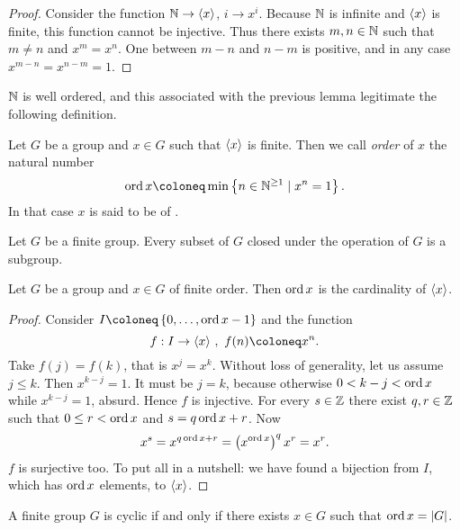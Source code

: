 \begin{proof}
Consider the function \(\mathbb N \to \left\langle x\right\rangle\), \(i \to x^i\). Because \(\mathbb N\) is infinite and \(\left\langle x\right\rangle\) is finite, this function cannot be injective. Thus there exists \(m, n \in \mathbb N\) such that \(m \ne n\) and \(x^m = x^n\). One between \(m-n\) and \(n-m\) is positive, and in any case \(x^{m-n} = x^{n-m} = 1\).
\end{proof}

\(\mathbb N\) is well ordered, and this associated with the previous lemma legitimate the following definition.

\begin{definition}
Let \(G\) be a group and \(x \in G\) such that \(\left\langle x\right\rangle\) is finite. Then we call {\em order} of \(x\) the natural number
\[\ord x \coloneq \min \set{n \in \nn^{\ge 1} \mid x^n = 1}.\]
In that case \(x\) is said to be of .
\end{definition}

\begin{exercise}
Let \(G\) be a finite group. Every subset of \(G\) closed under the operation of \(G\) is a subgroup.
\end{exercise}

\begin{proposition}\label{prop:OrdIsCardinality}
Let \(G\) be a group and \(x \in G\) of finite order. Then \(\operatorname{ord} x\) is the cardinality of \(\left\langle x\right\rangle\).
\end{proposition}

\begin{proof}
Consider \(I \coloneq \set{0, \dots{}, \ord x-1}\) and the function
\[f : I \to \gen x\,, \ f(n) \coloneq x^n.\]
Take \(f(j) = f(k)\), that is \(x^j = x^k\). Without loss of generality, let us assume \(j \le k\). Then \(x^{k-j} = 1\). It must be \(j = k\), because otherwise \(0 < k-j < \operatorname{ord} x\) while \(x^{k-j} = 1\), absurd. Hence \(f\) is injective.\newline
For every \(s \in \mathbb Z\) there exist \(q, r \in \mathbb Z\) such that \(0 \le r < \operatorname{ord} x\) and \(s = q \operatorname{ord} x +r\). Now
\[x^s = x^{q \operatorname{ord} x +r} = \left(x^{\operatorname{ord} x}\right)^q x^r = x^r.\]
\(f\) is surjective too.\newline
To put all in a nutshell: we have found a bijection from \(I\), which has \(\operatorname{ord} x\) elements, to \(\left\langle x\right\rangle\).
\end{proof}

\begin{proposition}\label{prop:CyclicIffOrdIsCard}
A finite group \(G\) is cyclic if and only if there exists \(x \in G\) such that \(\operatorname{ord} x = \lvert G \rvert\).
\end{proposition}

